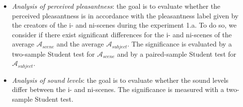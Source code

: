 \documentclass[12pt]{elsarticle}
\newcommand{\ie}{\emph{i.\,e.}}
\begin{document}
\begin{itemize}


\item \emph{Analysis of perceived pleasantness}: the goal is to evaluate whether the perceived pleasantness is in accordance with the pleasantness label given by the creators of the  i- and ni-scenes during the experiment 1.a. To do so, we consider if there exist significant differences for the i- and ni-scenes of the average $\mathcal{A}_{scene}$ and the average $\mathcal{A}_{subject}$. The significance is evaluated by a two-sample Student test for $\mathcal{A}_{scene}$ and by a paired-sample Student test for $\mathcal{A}_{subject}$.




\item \emph{Analysis of sound levels}: the goal is to evaluate whether the sound levels differ between the i- and ni-scenes. The significance is measured with a two-sample Student test.



\end{itemize}
\end{document}
